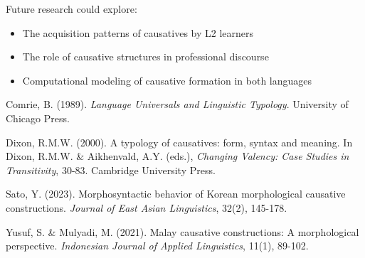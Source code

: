 \documentclass[12pt,a4paper]{article}
\begin{document}
Future research could explore:
\begin{itemize}
\item The acquisition patterns of causatives by L2 learners
\item The role of causative structures in professional discourse
\item Computational modeling of causative formation in both languages
\end{itemize}


\begin{thebibliography}{9}

Comrie, B. (1989). \textit{Language Universals and Linguistic Typology}. University of Chicago Press.

Dixon, R.M.W. (2000). A typology of causatives: form, syntax and meaning. In Dixon, R.M.W. \& Aikhenvald, A.Y. (eds.), \textit{Changing Valency: Case Studies in Transitivity}, 30-83. Cambridge University Press.

Sato, Y. (2023). Morphosyntactic behavior of Korean morphological causative constructions. \textit{Journal of East Asian Linguistics}, 32(2), 145-178.

Yusuf, S. \& Mulyadi, M. (2021). Malay causative constructions: A morphological perspective. \textit{Indonesian Journal of Applied Linguistics}, 11(1), 89-102.

\end{thebibliography}
\end{document}
